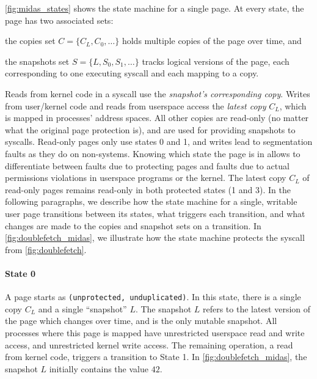 \documentclass[letterpaper,twocolumn,10pt]{article}
\begin{document}
\autoref{fig:midas_states} shows the state machine for a single page.
At every state, the page has two associated sets:
\begin{inparaenum}
  \item the copies set $C = \{C_L, C_0, \dots\}$ holds multiple copies of the page over time, and
  \item the snapshots set $S = \{L, S_0, S_1, \dots\}$ tracks logical versions of the page, each corresponding to one executing syscall and each mapping to a copy. 
\end{inparaenum}
Reads from kernel code in a syscall use the \emph{snapshot's corresponding copy}.
Writes from user/kernel code and reads from userspace access the \emph{latest 
copy} $C_L$, which is mapped in processes' address spaces.
All other copies are read-only (no matter what the original page protection is), and are used for providing snapshots to syscalls.
Read-only pages only use states 0 and 1, and writes lead to segmentation faults
as they do on non-\midas systems.
Knowing which state the page is in allows \midas to differentiate between 
faults due to \midas protecting pages and faults due to actual permissions 
violations in userspace programs or the kernel.
The latest copy $C_L$ of read-only pages remains read-only in both
protected states (1 and 3).
In the following paragraphs, we describe how the state machine for a single, 
writable user page transitions between its states, what triggers each transition, 
and what changes are made to the copies and snapshot sets on a transition.
In \autoref{fig:doublefetch_midas}, we illustrate how the state machine protects the 
syscall from \autoref{fig:doublefetch}.

\paragraph{State 0}
A page starts as \texttt{(unprotected, unduplicated)}.
In this state, there is a single copy $C_L$ and a single ``snapshot'' $L$. 
The snapshot $L$ refers to the latest version of the page which changes 
over time, and is the only mutable snapshot.
All processes where this page is mapped have unrestricted userspace read and write 
access, and unrestricted kernel write access.
The remaining operation, a read from kernel code, triggers a transition to 
State 1.
In \autoref{fig:doublefetch_midas}, the snapshot $L$ initially contains 
the value $42$.
\end{document}
